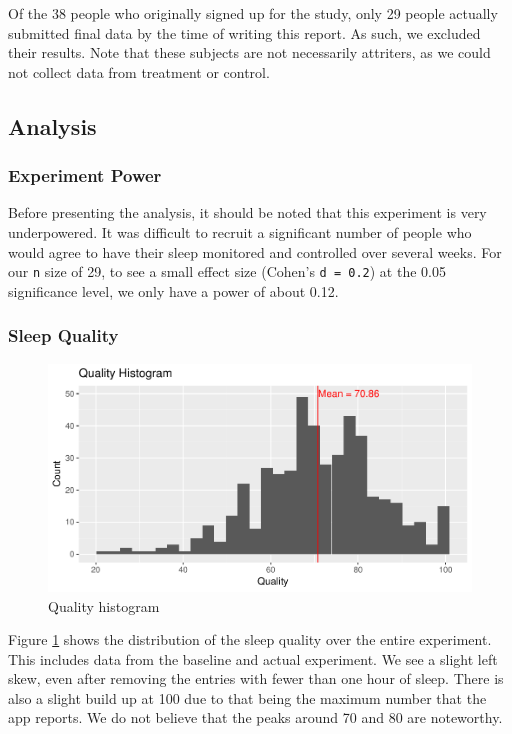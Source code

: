 \documentclass[12pt,]{article}
\begin{document}
Of the 38 people who originally signed up for the study, only 29 people
actually submitted final data by the time of writing this report. As
such, we excluded their results. Note that these subjects are not
necessarily attriters, as we could not collect data from treatment or
control.

\hypertarget{analysis}{%
\subsection{Analysis}\label{analysis}}

\hypertarget{experiment-power}{%
\subsubsection{Experiment Power}\label{experiment-power}}

Before presenting the analysis, it should be noted that this experiment
is very underpowered. It was difficult to recruit a significant number
of people who would agree to have their sleep monitored and controlled
over several weeks. For our \texttt{n} size of 29, to see a small effect
size (Cohen's \texttt{d\ =\ 0.2}) at the 0.05 significance level, we
only have a power of about 0.12.

\hypertarget{sleep-quality}{%
\subsubsection{Sleep Quality}\label{sleep-quality}}

\begin{figure}
\centering
\includegraphics{report_files/figure-latex/quality_histogram-1.pdf}
\caption{\label{fig:quality_histogram} Quality histogram}
\end{figure}

Figure \ref{fig:quality_histogram} shows the distribution of the sleep
quality over the entire experiment. This includes data from the baseline
and actual experiment. We see a slight left skew, even after removing
the entries with fewer than one hour of sleep. There is also a slight
build up at 100 due to that being the maximum number that the app
reports. We do not believe that the peaks around 70 and 80 are
noteworthy.
\end{document}

